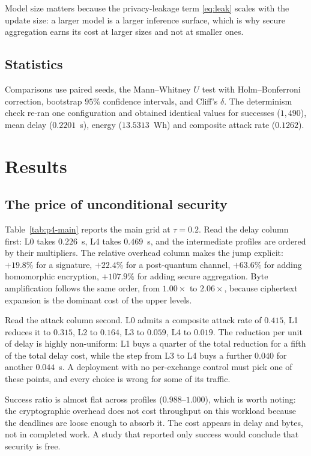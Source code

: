 \documentclass[journal,10pt]{IEEEtran}
\begin{document}
Model size matters because the privacy-leakage term \eqref{eq:leak} scales with
the update size: a larger model is a larger inference surface, which is why
secure aggregation earns its cost at larger sizes and not at smaller ones.

\subsection{Statistics}
Comparisons use paired seeds, the Mann--Whitney $U$ test with Holm--Bonferroni
correction, bootstrap $95\%$ confidence intervals, and Cliff's $\delta$. The
determinism check re-ran one configuration and obtained identical values for
successes ($1{,}490$), mean delay ($0.2201$~s), energy ($13.5313$~Wh) and
composite attack rate ($0.1262$).

\section{Results}
\label{sec:res}

\subsection{The price of unconditional security}
Table~\ref{tab:p4-main} reports the main grid at $\tau=0.2$. Read the delay
column first: L0 takes $0.226$~s, L4 takes $0.469$~s, and the intermediate
profiles are ordered by their multipliers. The relative overhead column makes
the jump explicit: $+19.8\%$ for a signature, $+22.4\%$ for a post-quantum
channel, $+63.6\%$ for adding homomorphic encryption, $+107.9\%$ for adding
secure aggregation. Byte amplification follows the same order, from $1.00\times$
to $2.06\times$, because ciphertext expansion is the dominant cost of the
upper levels.

Read the attack column second. L0 admits a composite attack rate of $0.415$,
L1 reduces it to $0.315$, L2 to $0.164$, L3 to $0.059$, L4 to $0.019$. The
reduction per unit of delay is highly non-uniform: L1 buys a quarter of the
total reduction for a fifth of the total delay cost, while the step from L3 to
L4 buys a further $0.040$ for another $0.044$~s. A deployment with no
per-exchange control must pick one of these points, and every choice is wrong
for some of its traffic.

Success ratio is almost flat across profiles ($0.988$--$1.000$), which is worth
noting: the cryptographic overhead does not cost throughput on this workload
because the deadlines are loose enough to absorb it. The cost appears in delay
and bytes, not in completed work. A study that reported only success would
conclude that security is free.
\end{document}
